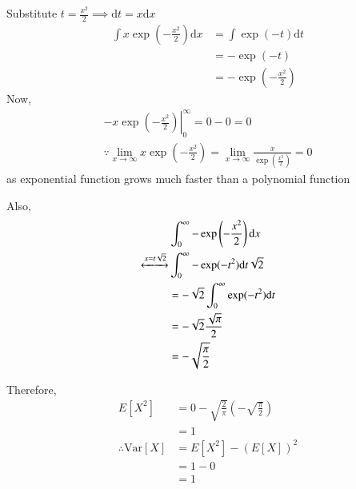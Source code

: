 \documentclass[journal,12pt,twocolumn]{IEEEtran}
\providecommand{\brak}[1]{\ensuremath{\left(#1\right)}}
\providecommand{\mean}[1]{E\left[ #1 \right]}
\providecommand{\var}[1]{\mathrm{Var}\left[ #1 \right]}
\providecommand{\der}[1]{\mathrm{d} #1}
\numberwithin{equation}{section}
\renewcommand\thesection{\arabic{section}}
\begin{document}
\begin{enumerate}[label=\thesection.\arabic*,ref=\thesection.\theenumi]
	Substitute $t = \frac{x^2}{2} \implies \der{t} = x\der{x}$
	\begin{align}
		\int x \exp\brak{-\frac{x^2}{2}} \der{x} &= \int \exp(-t) \der{t} \\
		&= - \exp(-t) \\
		&= - \exp\brak{-\frac{x^2}{2}}
	\end{align}
	Now,
	\begin{align}
		\left. -x \exp\brak{-\frac{x^2}{2}} \right|_0^{\infty} = 0 - 0 = 0 \\
		\because \lim_{x\to\infty} x \exp\brak{-\frac{x^2}{2}} = \lim_{x\to\infty} \frac{x}{\exp\brak{\frac{x^2}{2}}} =0
	\end{align}
	as exponential function grows much faster than a polynomial function
	
	Also, 
	\begin{align}
		&\int_0^{\infty} - \exp\brak{-\frac{x^2}{2}} \der{x} \\
		\xleftrightarrow{x = t\sqrt{2}} &\int_0^{\infty} -\exp(-t^2) \der{t}\sqrt{2} \\
		&= -{\sqrt{2}} \int_0^{\infty} \exp(-t^2) \der{t} \\
		&= -{\sqrt{2}} \frac{\sqrt{\pi}}{2} \\
		&= - \sqrt{\frac{\pi}{2}}
	\end{align}
	
	Therefore,
	\begin{align}
		\mean{X^2} &= 0 - \sqrt{\frac{2}{\pi}} \brak{- \sqrt{\frac{\pi}{2}}} \\
		&= 1 \\
		\therefore \var{X} &= \mean{X^2} - \brak{\mean{X}}^2 \\
		&= 1 - 0 \\
		&= 1
	\end{align}
	\end{enumerate}
	
\end{document}
